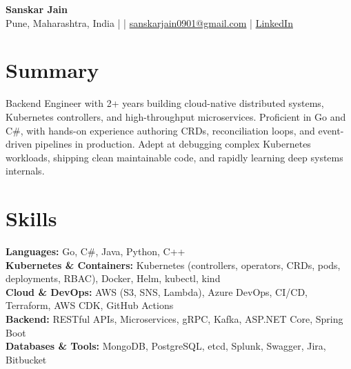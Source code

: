 \documentclass[9pt,letterpaper]{article}
\begin{document}
\begin{center}
    {\Large \textbf{Sanskar Jain}} \\
    Pune, Maharashtra, India \enspace |  \enspace | \enspace
    \href{mailto:sanskarjain0901@gmail.com}{sanskarjain0901@gmail.com} \enspace | \enspace
    \href{https://www.linkedin.com/in/sanskar-jain0901/}{LinkedIn}
\end{center}

\section*{Summary}
Backend Engineer with 2+ years building cloud-native distributed systems, Kubernetes controllers, and high-throughput microservices. Proficient in Go and C\#, with hands-on experience authoring CRDs, reconciliation loops, and event-driven pipelines in production. Adept at debugging complex Kubernetes workloads, shipping clean maintainable code, and rapidly learning deep systems internals.

\section*{Skills}
\textbf{Languages:} Go, C\#, Java, Python, C++ \\
\textbf{Kubernetes \& Containers:} Kubernetes (controllers, operators, CRDs, pods, deployments, RBAC), Docker, Helm, kubectl, kind \\
\textbf{Cloud \& DevOps:} AWS (S3, SNS, Lambda), Azure DevOps, CI/CD, Terraform, AWS CDK, GitHub Actions \\
\textbf{Backend:} RESTful APIs, Microservices, gRPC, Kafka, ASP.NET Core, Spring Boot \\
\textbf{Databases \& Tools:} MongoDB, PostgreSQL, etcd, Splunk, Swagger, Jira, Bitbucket
\end{document}
